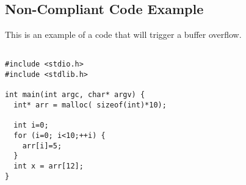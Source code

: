\subsection{Non-Compliant Code Example}

This is an example of a code that will trigger a buffer overflow.

\begin{verbatim}

#include <stdio.h>
#include <stdlib.h>

int main(int argc, char* argv) {
  int* arr = malloc( sizeof(int)*10);

  int i=0;
  for (i=0; i<10;++i) {
    arr[i]=5;
  }
  int x = arr[12];
}

\end{verbatim}



